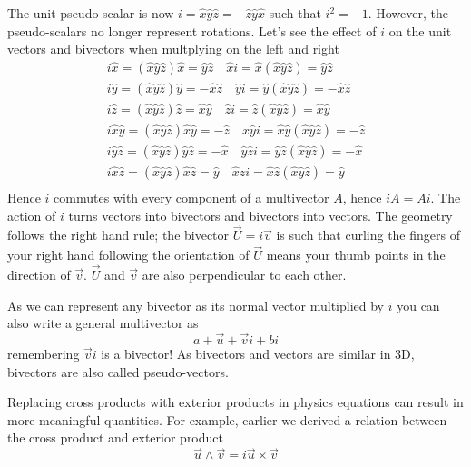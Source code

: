 \documentclass[options]{report}
\def \u{\vec{u}}
\def \v{\vec{v}}
\def \xhat{\hat{x}}
\def \yhat{\hat{y}}
\def \zhat{\hat{z}}
\begin{document}
The unit pseudo-scalar is now $i = \xhat \yhat \zhat = - \zhat \yhat \xhat$ such that $i^2 = -1$. However, the pseudo-scalars no longer represent rotations. Let's see the effect of $i$ on the unit vectors and bivectors when multplying on the left and right
\begin{equation*}
	\begin{gathered}
		i \xhat = (\xhat \yhat \zhat) \xhat = \yhat \zhat \quad \xhat i = \xhat (\xhat \yhat \zhat) = \yhat \zhat \\
		i \yhat = (\xhat \yhat \zhat) \yhat = - \xhat \zhat \quad \yhat i = \yhat (\xhat \yhat \zhat) = -\xhat \zhat \\
		i \zhat = (\xhat \yhat \zhat) \zhat = \xhat \yhat \quad \zhat i = \zhat (\xhat \yhat \zhat) = \xhat \yhat \\
		i \xhat \yhat = (\xhat \yhat \zhat) \xhat \yhat = - \zhat \quad \xhat \yhat i = \xhat \yhat (\xhat \yhat \zhat) = - \zhat \\
		i \yhat \zhat = (\xhat \yhat \zhat) \yhat \zhat = - \xhat \quad \yhat \zhat i = \yhat \zhat (\xhat \yhat \zhat) = - \xhat \\
		i \xhat \zhat = (\xhat \yhat \zhat) \xhat \zhat = \yhat \quad \xhat \zhat i = \xhat \zhat (\xhat \yhat \zhat) = \yhat \\
	\end{gathered}
\end{equation*}
Hence $i$ commutes with every component of a multivector $A$, hence $iA = Ai$. The action of $i$ turns vectors into bivectors and bivectors into vectors. The geometry follows the right hand rule; the bivector $\vec{U} = i \v$ is such that curling the fingers of your right hand following the orientation of $\vec{U}$ means your thumb points in the direction of $\v$. $\vec{U}$ and $\v$ are also perpendicular to each other.

As we can represent any bivector as its normal vector multiplied by $i$ you can also write a general multivector as
\begin{equation}
	a + \u + \v i + b i
\end{equation}
remembering $\v i$ is a bivector! As bivectors and vectors are similar in 3D, bivectors are also called pseudo-vectors.

Replacing cross products with exterior products in physics equations can result in more meaningful quantities. For example, earlier we derived a relation between the cross product and exterior product
\begin{equation*}
	\u \wedge \v = i \u \times \v
\end{equation*}
\end{document}
